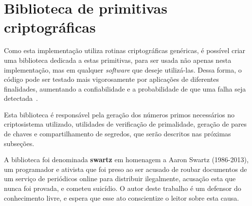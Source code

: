 \section{Biblioteca de primitivas criptográficas}

Como esta implementação utiliza rotinas criptográficas genéricas, é possível
criar uma biblioteca dedicada a estas primitivas, para ser usada não apenas
nesta implementação, mas em qualquer \textit{software} que deseje utilizá-las.
Dessa forma, o código pode ser testado mais vigorosamente por aplicações de
diferentes finalidades, aumentando a confiabilidade e a probabilidade de que
uma falha seja detectada~\cite{hursch1995separation}.

Esta biblioteca é responsável pela geração dos números primos necessários no
criptosistema utilizado, utilidades de verificação de primalidade, geração de
pares de chaves e compartilhamento de segredos, que serão descritos nas
próximas subseções.

A biblioteca foi denominada \textbf{swartz} em homenagem a Aaron Swartz
(1986-2013), um programador e ativista que foi preso ao ser acusado de roubar
documentos de um serviço de periódicos online para distribuir ilegalmente,
acusação esta que nunca foi provada, e cometeu suicídio. O autor deste trabalho
é um defensor do conhecimento livre, e espera que esse ato conscientize o
leitor sobre esta causa.



